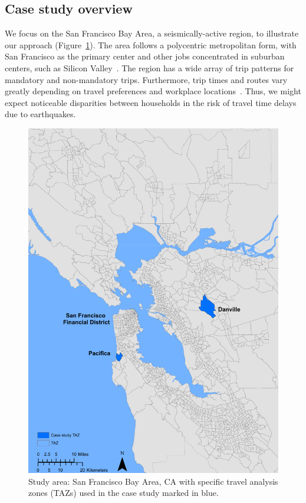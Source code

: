 \subsection{Case study overview}
We focus on the San Francisco Bay Area, a seismically-active region, to illustrate our approach (Figure~\ref{fig:equity_study_area}). The area follows a polycentric metropolitan form, with San Francisco as the primary center and other jobs  concentrated in suburban centers, such as Silicon Valley~\cite{cervero_polycentrism_1997}. The region has a wide array of trip patterns for mandatory and non-mandatory trips. Furthermore, trip times and routes vary greatly depending on travel preferences and workplace locations~\cite{cervero_polycentrism_1997}. Thus,  we might expect noticeable disparities between households in the risk of travel time delays due to earthquakes. 

\begin{figure}
\centering
\includegraphics[width=6in]{FIGS/equity_case.pdf} 
\caption{Study area: San Francisco Bay Area, CA with specific travel analysis zones (TAZs) used in the case study marked in blue.}
\label{fig:equity_study_area}
\end{figure}

